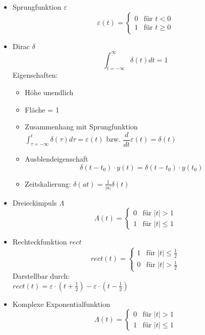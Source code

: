   \begin{mdframed}[style=exercise]
      \begin{itemize}
          \item{Sprungfunktion $\varepsilon$}
          \[ \varepsilon(t) =
             \begin{cases}
                 0 & \text{f\"ur } t < 0\\
                 1 & \text{f\"ur } t \geq 0
             \end{cases}
          \]
          \item{Dirac $\delta$}
          \[
              \int_{t=-\infty}^{\infty} \delta(t)dt = 1
          \]
          Eigenschaften:
          \begin{itemize}
              \item{H\"ohe unendlich}
              \item{Fl\"ache = 1}
              \item{Zusammenhang mit Sprungfunktion}\\
                  $\int_{\tau=-\infty}^{t}\delta(\tau)d\tau =
                  \varepsilon(t)$ bzw.  $\dfrac{d}{dt}\varepsilon(t) =
                  \delta(t)$
              \item{Ausblendeigenschaft}
                  \[
                      \delta(t-t_0)\cdot y(t) = \delta(t-t_0)\cdot y(t_0)
                  \]
              \item{Zeitskalierung: }
                  $\delta(at)=\frac{1}{\lvert a\rvert}\delta(t)$
          \end{itemize}
          \item{Dreieckimpuls $\Lambda$}
          \[ \Lambda(t) =
             \begin{cases}
                 0 & \text{f\"ur } \vert t\rvert > 1\\
                 1 & \text{f\"ur } \vert t\rvert \leq 1
             \end{cases}
          \]
          \item{Rechteckfunktion $rect$}
          \[ rect(t) =
             \begin{cases}
                 1 & \text{f\"ur } \vert t\rvert \leq \frac{1}{2}\\
                 0 & \text{f\"ur } \vert t\rvert > \frac{1}{2}
             \end{cases}
          \]
          Darstellbar durch:\\ $rect(t) = \varepsilon\cdot\left( t+\frac{1}{2} \right)-\varepsilon\cdot\left( t-\frac{1}{2} \right)$
          \item{Komplexe Exponentialfunktion}
          \[ \Lambda(t) =
             \begin{cases}
                 0 & \text{f\"ur } \vert t\rvert > 1\\
                 1 & \text{f\"ur } \vert t\rvert \leq 1
             \end{cases}
          \]
      \end{itemize}
  \end{mdframed}

